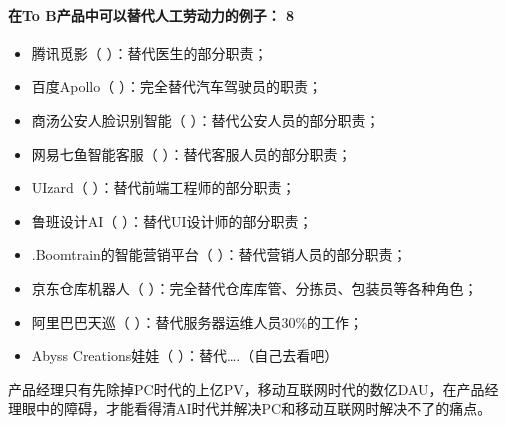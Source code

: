 \documentclass[letterpaper,11pt,english]{sphinxmanual}
\begin{document}
\paragraph{在To B产品中可以替代人工劳动力的例子： 8\sphinxfootnotemark[72]}
\label{\detokenize{chapter_introduction/AI:to-b-8}}%
\begin{footnotetext}[72]\sphinxAtStartFootnote
{}
%
\end{footnotetext}\ignorespaces \begin{itemize}
\item {} 
腾讯觅影（ ）：替代医生的部分职责；

\item {} 
百度Apollo（ ）：完全替代汽车驾驶员的职责；

\item {} 
商汤\sphinxhyphen{}公安人脸识别智能（
）：替代公安人员的部分职责；

\item {} 
网易七鱼\sphinxhyphen{}智能客服（ ）：替代客服人员的部分职责；

\item {} 
UIzard（ ）：替代前端工程师的部分职责；

\item {} 
鲁班设计AI（ ）：替代UI设计师的部分职责；

\item {} 
.Boomtrain的智能营销平台（
）：替代营销人员的部分职责；

\item {} 
京东仓库机器人（
）：完全替代仓库库管、分拣员、包装员等各种角色；

\item {} 
阿里巴巴天巡（ ）：替代服务器运维人员30\%的工作；

\item {} 
Abyss Creations娃娃（ ）：替代….（自己去看吧）

\end{itemize}

产品经理只有先除掉PC时代的上亿PV，移动互联网时代的数亿DAU，在产品经理眼中的障碍，才能看得清AI时代并解决PC和移动互联网时解决不了的痛点。
\end{document}
